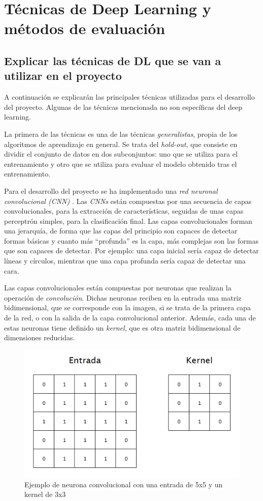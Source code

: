 \section{Técnicas de Deep Learning y métodos de evaluación}
\label{sec:tecnicas_de_deep_learning_y_metodos_de_evaluacion}

\subsection{Explicar las técnicas de DL que se van a utilizar en el proyecto}

A continuación se explicarán las principales técnicas utilizadas para el desarrollo del proyecto. Algunas de las técnicas mencionada no son específicas del deep learning.

La primera de las técnicas es una de las técnicas \textit{generalistas}, propia de los algoritmos de aprendizaje en general. Se trata del \textit{hold-out}, que consiste en dividir el conjunto de datos en dos subconjuntos: uno que se utiliza para el entrenamiento y otro que se utiliza para evaluar el modelo obtenido tras el entrenamiento.

Para el desarrollo del proyecto se ha implementado una \textit{red neuronal convolucional (CNN)} \cite{s5_cnn1} \cite{s5_cnn2} \cite{s5_cnn3}. Las \textit{CNNs} están compuestas por una secuencia de capas convolucionales, para la extracción de características, seguidas de unas capas perceptrón simples, para la clasificación final. Las capas convolucionales forman una jerarquía, de forma que las capas del principio son capaces de detectar formas básicas y cuanto más ``profunda'' es la capa, más complejas son las formas que son capaces de detectar. Por ejemplo: una capa inicial sería capaz de detectar líneas y círculos, mientras que una capa profunda sería capaz de detectar una cara.

Las capas convolucionales están compuestas por neuronas que realizan la operación de \textit{convolución}. Dichas neuronas reciben en la entrada una matriz bidimensional, que se corresponde con la imagen, si se trata de la primera capa de la red, o con la salida de la capa convolucional anterior. Además, cada una de estas neuronas tiene definido un \textit{kernel}, que es otra matriz bidimensional de dimensiones reducidas.

\begin{figure}[H]
	\centering
	\includegraphics[width=0.7\linewidth]{images/convolutional_neuron_example.png}
	\caption{Ejemplo de neurona convolucional con una entrada de 5x5 y un kernel de 3x3}
	\label{fig:cnn_neuronex}
\end{figure}

